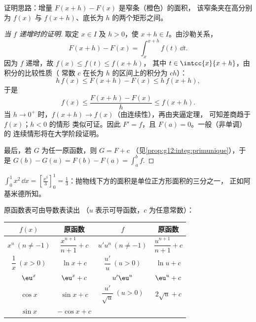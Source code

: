 \begin{omfigure}

{\small 证明思路：增量 $F(x+h) - F(x)$ 是窄条（橙色）的面积，
该窄条夹在高分别为
$f(x)$ 与 $f(x+h)$、底长为 $h$ 的两个矩形之间。}
\end{omfigure}

\begin{proof}[当 $f$ 递增时的证明]
取定 $x \in I$ 及 $h > 0$，使 $x + h \in I$。由沙勒关系，
\[
F(x+h) - F(x) = \int_x^{x+h} f(t)\,\dd t .
\]
因为 $f$ 递增，故 $f(x) \leq f(t) \leq f(x+h)$，
其中 $t \in \intcc{x}{x+h}$，由积分的比较性质（
常数 $c$ 在长为 $h$ 的区间上的积分为 $ch$）：
\[
h\,f(x) \leq F(x+h) - F(x) \leq h\,f(x+h),
\]
于是
\[
f(x) \leq \frac{F(x+h) - F(x)}{h} \leq f(x+h).
\]
当 $h \to 0^+$ 时，$f(x+h) \to f(x)$（由连续性），再由夹逼定理，
可知差商趋于 $f(x)$；$h < 0$ 的情形
类似可证。因此 $F' = f$，且 $F(a) = 0$。一般（非单调）的
连续情形将在大学阶段证明。

最后，若 $G$ 为任一原函数，则 $G = F + c$
（见\cref{prop:g12:integ:primunique}），于是
$G(b) - G(a) = F(b) - F(a) = \int_a^b f$.
\end{proof}

\begin{example}
$\displaystyle\int_0^1 x^2\,\dd x = \left[\frac{x^3}{3}\right]_0^1 =
\frac13$：抛物线下方的面积是单位正方形面积的三分之一，
正如阿基米德所知。
\end{example}

原函数表可由导数表读出
（$u$ 表示可导函数，$c$ 为任意常数）：
\begin{center}
\renewcommand{\arraystretch}{1.7}
\begin{tabular}{c|c||c|c}
$f(x)$ & 原函数 & $f$ & 原函数 \\
\hline
$x^n \ (n \neq -1)$ & $\dfrac{x^{n+1}}{n+1} + c$ &
$u'u^n \ (n \neq -1)$ & $\dfrac{u^{n+1}}{n+1} + c$\\
$\dfrac1x \ (x > 0)$ & $\ln x + c$ &
$\dfrac{u'}{u} \ (u > 0)$ & $\ln u + c$\\
$\eu^x$ & $\eu^x + c$ &
$u'\eu^u$ & $\eu^u + c$\\
$\cos x$ & $\sin x + c$ &
$\dfrac{u'}{\sqrt u} \ (u>0)$ & $2\sqrt u + c$\\
$\sin x$ & $-\cos x + c$ & &
\end{tabular}
\end{center}


